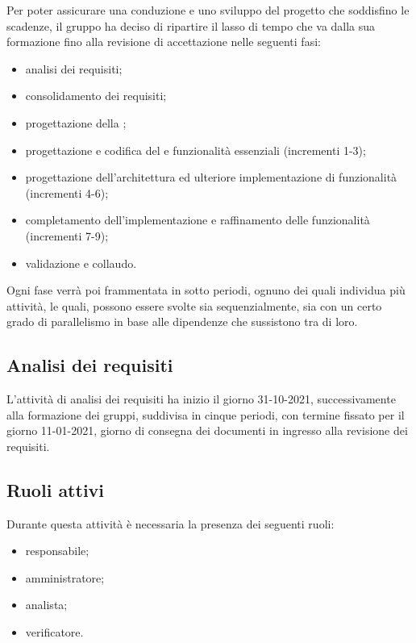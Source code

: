 Per poter assicurare una conduzione e uno sviluppo del progetto che soddisfino le scadenze, il gruppo ha deciso di ripartire il lasso di tempo che va dalla sua formazione fino alla revisione di accettazione nelle seguenti fasi: 

\begin{itemize} 
	\item analisi dei requisiti; 
	\item consolidamento dei requisiti; 
	\item progettazione della ;
	\item progettazione e codifica del  e funzionalità essenziali (incrementi 1-3);
	\item progettazione dell'architettura ed ulteriore implementazione di funzionalità (incrementi 4-6);
	\item completamento dell'implementazione e raffinamento delle funzionalità (incrementi 7-9);
	\item validazione e collaudo.
\end{itemize}
Ogni fase verrà poi frammentata in sotto periodi, ognuno dei quali individua più attività, le quali, possono essere svolte sia sequenzialmente, sia con un certo grado di parallelismo in base alle dipendenze che sussistono tra di loro. 


\subsection{Analisi dei requisiti} 
L’attività di analisi dei requisiti ha inizio il giorno 31-10-2021, successivamente alla formazione dei gruppi, suddivisa in cinque periodi, con termine fissato per il giorno 11-01-2021, giorno di consegna dei documenti in ingresso alla revisione dei requisiti. 

\subsection{Ruoli attivi} 
Durante questa attività è necessaria la presenza dei seguenti ruoli: 
\begin{itemize} 
	\item responsabile; 
	\item amministratore; 
	\item analista; 
	\item verificatore. 
\end{itemize} 

